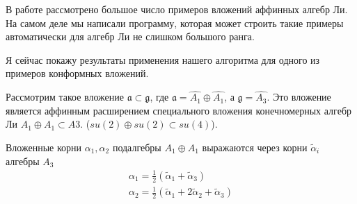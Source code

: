 В работе рассмотрено большое число примеров вложений аффинных алгебр Ли. На самом деле мы написали
программу, которая может строить такие примеры автоматически для алгебр Ли не слишком большого
ранга.

Я сейчас покажу результаты применения нашего алгоритма для одного из примеров конформных вложений.

Рассмотрим такое вложение $\mathfrak{a}\subset \mathfrak{g}$, где
$\mathfrak{a}=\hat{A_1}\oplus \hat{A_1}$, а $\mathfrak{g}= \hat{A_3}$. Это
вложение является аффинным расширением специального вложения конечномерных алгебр Ли $A_1\oplus
A_1\subset A3$. ($su(2)\oplus su(2)\subset su(4)$).
\begin{comment}
 Это специальное вложение строится следующим образом: берем четырехмерное
представление $A_1\oplus A_1$ со старшим весом $(1,1)$. Вот веса этого представления
\ref{fig:A_1+A_1_to_A3}, их координаты в базисе фундаментальных весов: $\nu_1=(1,1),\; \nu_2=(-1,1),\; \nu_3=(1,-1),\; \nu_4=(-1,-1)$.

\begin{figure}[h]
  \begin{multicols}{2}
    \hfill
    \texttt{[image: A\_1+A\_1\_to\_A3]}
    \hfill
    \caption{Представление для специального вложения $A_1\oplus A_1\subset A3$}
    \label{fig:A_1+A_1_to_A3}
    \hfill
    \texttt{[image: A1+A1-A3]}
    \hfill
    \caption{Вложенные корни $A_1\oplus A_1\subset A3$}
    \label{fig:A1+A1-A3}
  \end{multicols}
\end{figure}

Тогда матричные элементы представления генераторов подалгебры Картана $b_1,b_2$ в базисе Вейля
даются выражениями
\begin{equation}
  d(b_i)=\mathrm{diag}\left(\frac{2(\nu_1,\alpha_i)}{(\alpha_i,\alpha_i)},\frac{2(\nu_2,\alpha_i)}{(\alpha_i,\alpha_i)},\frac{2(\nu_3,\alpha_i)}{(\alpha_i,\alpha_i)},\frac{2(\nu_4,\alpha_i)}{(\alpha_i,\alpha_i)}\right),
\end{equation}
так что $d(b_1)=\mathrm{diag}(1,-1,1,-1),\;
  d(b_2)=\mathrm{diag}(1,1,-1,-1).$
\end{comment}
Вложенные корни $\alpha_1,\alpha_2$ подалгебры $A_1\oplus A_1$
выражаются через корни $\tilde{\alpha}_i$ алгебры  $A_3$
\begin{equation}
  \label{eq:37}
  \begin{array}{l}
     \alpha_1=\frac{1}{2}(\tilde{\alpha}_1+\tilde{\alpha}_3)\\
     \alpha_2=\frac{1}{2}(\tilde{\alpha}_1+2\tilde{\alpha}_2+\tilde{\alpha}_3)
  \end{array}
\end{equation}
\begin{comment}
Они изображены на рисунке \ref{fig:A1+A1-A3}.
\end{comment}


